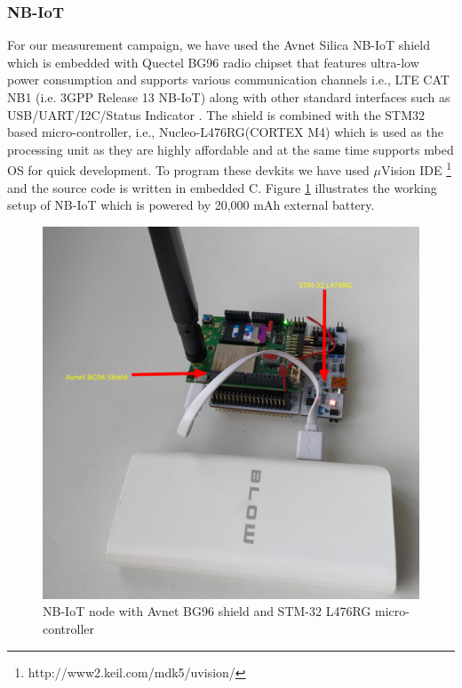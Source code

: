 \documentclass[12pt]{article}
\begin{document}
\subsubsection{NB-IoT}\label{NB-IoT experimental setup}
For our measurement campaign, we have used the Avnet Silica NB-IoT shield which is embedded with Quectel BG96 radio chipset that features ultra-low power consumption and supports various communication channels i.e., LTE CAT NB1 (i.e. 3GPP Release 13 NB-IoT) along with other standard interfaces such as USB/UART/I2C/Status Indicator \cite{avnetBG96}. The shield is combined with the STM32 based micro-controller, i.e., Nucleo-L476RG(CORTEX M4) \cite{STM} which is used as the processing unit as they are highly affordable and at the same time supports mbed OS for quick development. To program these devkits we have used $\mu$Vision IDE \footnote{http://www2.keil.com/mdk5/uvision/} and the source code is written in embedded C. Figure \ref{fig:NB-IoT node with Avnet BG96 shield and STM-32 L476RG micro-controller} illustrates the working setup of NB-IoT which is powered by 20,000 mAh external battery. \par

\begin{figure}[H]
    \centering
    \includegraphics[trim=1cm 0cm 2cm 1cm,clip=true,width=0.9\columnwidth,totalheight=8cm ,width=0.9\columnwidth,keepaspectratio]{Images/nb-iotNode.pdf}
    \caption{NB-IoT node with Avnet BG96 shield and STM-32 L476RG micro-controller}
    \label{fig:NB-IoT node with Avnet BG96 shield and STM-32 L476RG micro-controller}
\end{figure}
\end{document}
